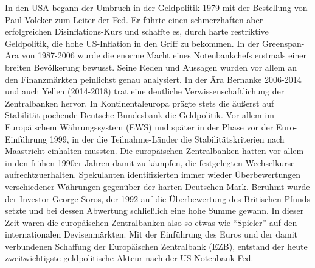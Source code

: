 In den USA begann der Umbruch in der Geldpolitik 1979 mit der Bestellung von Paul Volcker zum Leiter der Fed. Er führte einen schmerzhaften aber erfolgreichen Disinflations-Kurs und schaffte es, durch harte restriktive Geldpolitik, die hohe US-Inflation in den Griff zu bekommen. In der Greenspan-Ära von 1987-2006 wurde die enorme Macht eines Notenbankchefs erstmals einer breiten Bevölkerung bewusst. Seine Reden und Aussagen wurden vor allem an den Finanzmärkten peinlichst genau analysiert. In der Ära Bernanke 2006-2014 und auch Yellen (2014-2018) trat eine deutliche Verwissenschaftlichung der Zentralbanken hervor. In Kontinentaleuropa prägte stets die äußerst auf Stabilität pochende Deutsche Bundesbank die Geldpolitik. Vor allem im Europäischem Währungssystem (EWS) und später in der Phase vor der Euro-Einführung 1999, in der die Teilnahme-Länder die Stabilitätskriterien nach Maastricht einhalten mussten. Die europäischen Zentralbanken hatten vor allem in den frühen 1990er-Jahren damit zu kämpfen, die festgelegten Wechselkurse aufrechtzuerhalten. Spekulanten identifizierten immer wieder Überbewertungen verschiedener Währungen gegenüber der harten Deutschen Mark. Berühmt wurde der Investor George Soros, der 1992 auf die Überbewertung des Britischen Pfunds setzte und bei dessen Abwertung schließlich eine hohe Summe gewann. In dieser Zeit waren die europäischen Zentralbanken also so etwas wie "`Spieler"' auf den internationalen Devisenmärkten. Mit der Einführung des Euros und der damit verbundenen Schaffung der Europäischen Zentralbank (EZB), entstand der heute zweitwichtigste geldpolitische Akteur nach der US-Notenbank Fed.

